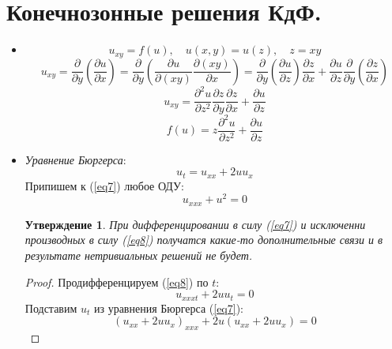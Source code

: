 \documentclass[12pt]{article}
\newtheorem{utv}{Утверждение}
\theoremstyle{definition}
\begin{document}
\section{Конечнозонные решения КдФ.}
\begin{itemize}
    \item[\textbf{ДЗ 9-1.}]
    \begin{equation}
        u_{xy}=f(u),\quad u(x,y)=u(z),\quad z=xy
    \end{equation}
    \begin{equation}
        u_{xy}=\frac{\partial}{\partial y}\left(\frac{\partial u}{\partial x}\right)=\frac{\partial}{\partial y}\left(\frac{\partial u}{\partial(xy)}\frac{\partial(xy)}{\partial x}\right)=\frac{\partial}{\partial y}\left(\frac{\partial u}{\partial z}\right)\frac{\partial z}{\partial x}+\frac{\partial u}{\partial z}\frac{\partial}{\partial y}\left(\frac{\partial z}{\partial x}\right)
    \end{equation}
    \begin{equation}
        u_{xy}=\frac{\partial^2u}{\partial z^2}\frac{\partial z}{\partial y}\frac{\partial z}{\partial x}+\frac{\partial u}{\partial z}
    \end{equation}
    \begin{equation}
        \boxed{f(u)=z\frac{\partial^2u}{\partial z^2}+\frac{\partial u}{\partial z}}
    \end{equation}
    \item[\textbf{ДЗ 9-2.}] \textit{Уравнение Бюргерса}:
    \begin{equation}\label{eq7}
        u_t=u_{xx}+2uu_x
    \end{equation}
    Припишем к (\ref{eq7}) любое ОДУ:
    \begin{equation}\label{eq8}
        u_{xxx}+u^2=0
    \end{equation}
    \begin{utv}
    При дифференцировании в силу (\ref{eq7}) и исключенни производных в силу (\ref{eq8}) получатся какие-то дополнительные связи и в результате нетривиальных решений не будет.
    \end{utv}
    \begin{proof}
        Продифференцируем (\ref{eq8}) по $t$:
        \begin{equation}
            u_{xxxt}+2uu_t=0
        \end{equation}
        Подставим $u_t$ из уравнения Бюргерса (\ref{eq7}):
        \begin{equation}
            (u_{xx}+2uu_x)_{xxx}+2u(u_{xx}+2uu_x)=0

\end{equation}
\end{proof}
\end{itemize}
\end{document}
